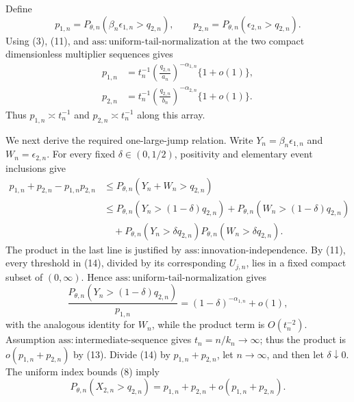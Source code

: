 Define
\[
p_{1,n}=P_{\theta,n}(\beta_n\epsilon_{1,n}>q_{2,n}),
\qquad
p_{2,n}=P_{\theta,n}(\epsilon_{2,n}>q_{2,n}).
\tag{12}
\]
Using (3), (11), and \(\mathrm{ass{:}uniform\text{-}tail\text{-}normalization}\) at the two compact dimensionless multiplier sequences gives
\[
\begin{split}
p_{1,n}&=t_n^{-1}\left(\frac{q_{2,n}}{a_n}\right)^{-\alpha_{1,n}}\{1+o(1)\},\\
p_{2,n}&=t_n^{-1}\left(\frac{q_{2,n}}{b_n}\right)^{-\alpha_{2,n}}\{1+o(1)\}.
\end{split}
\tag{13}
\]
Thus \(p_{1,n}\asymp t_n^{-1}\) and \(p_{2,n}\asymp t_n^{-1}\) along this array.

We next derive the required one-large-jump relation.  Write \(Y_n=\beta_n\epsilon_{1,n}\) and \(W_n=\epsilon_{2,n}\).  For every fixed \(\delta\in(0,1/2)\), positivity and elementary event inclusions give
\[
\begin{split}
p_{1,n}+p_{2,n}-p_{1,n}p_{2,n}
&\leq P_{\theta,n}(Y_n+W_n>q_{2,n})\\
&\leq P_{\theta,n}(Y_n>(1-\delta)q_{2,n})
+P_{\theta,n}(W_n>(1-\delta)q_{2,n})\\
&\quad+P_{\theta,n}(Y_n>\delta q_{2,n})
P_{\theta,n}(W_n>\delta q_{2,n}).
\end{split}
\tag{14}
\]
The product in the last line is justified by \(\mathrm{ass{:}innovation\text{-}independence}\).  By (11), every threshold in (14), divided by its corresponding \(U_{j,n}\), lies in a fixed compact subset of \((0,\infty)\).  Hence \(\mathrm{ass{:}uniform\text{-}tail\text{-}normalization}\) gives
\[
\frac{P_{\theta,n}(Y_n>(1-\delta)q_{2,n})}{p_{1,n}}
=(1-\delta)^{-\alpha_{1,n}}+o(1),
\tag{15}
\]
with the analogous identity for \(W_n\), while the product term is \(O(t_n^{-2})\).  Assumption \(\mathrm{ass{:}intermediate\text{-}sequence}\) gives \(t_n=n/k_n\to\infty\); thus the product is \(o(p_{1,n}+p_{2,n})\) by (13).  Divide (14) by \(p_{1,n}+p_{2,n}\), let \(n\to\infty\), and then let \(\delta\downarrow0\).  The uniform index bounds (8) imply
\[
P_{\theta,n}(X_{2,n}>q_{2,n})
=p_{1,n}+p_{2,n}+o(p_{1,n}+p_{2,n}).
\tag{16}
\]

